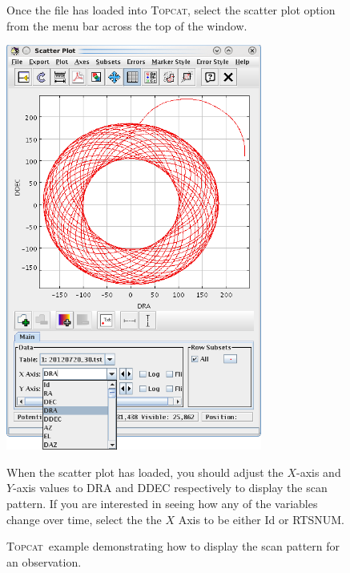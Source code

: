 \documentclass[twoside,11pt]{article}
\newcommand{\htmladdnormallink}[2]{#1}
\newenvironment{latexonly}{}{}
\renewcommand{\_}{\texttt{\symbol{95}}}
\newenvironment{fmpage}[1]{\begin{lrbox}{\fmbox}\begin{minipage}{#1}}{\end{minipage}\end{lrbox}\fbox{\usebox{\fmbox}}}
\newcommand{\topcat}{\htmladdnormallink{\textsc{Topcat}}{http://www.starlink.ac.uk/topcat}}
\begin{document}
\begin{latexonly}
\begin{figure}[ht!]
\begin{center}
\begin{fmpage}{0.95\linewidth}
\begin{minipage}[c]{0.6\linewidth}
\end{minipage}
\hspace{0.3cm}
\begin{minipage}[c]{0.32\linewidth}
Once the file has loaded into \topcat, select the scatter plot option
from the menu bar across the top of the window.
\end{minipage}

\vspace{0.5cm}

\begin{minipage}[c]{0.6\linewidth}
\centering
\includegraphics[width=0.75\textwidth]{sc21_topcat2}
\vspace{0.2cm}
\end{minipage}
\hspace{0.3cm}
\begin{minipage}[c]{0.32\linewidth}
When the scatter plot has loaded, you should adjust the $X$-axis and
$Y$-axis values to DRA and DDEC respectively to display the scan pattern.
If you are interested in seeing how any of the variables change over time,
select the the $X$ Axis to be either Id or RTS\_NUM.
\end{minipage}

\end{fmpage}
\end{center}
\caption{\small \topcat\ example demonstrating how to display the scan pattern
for an observation.}
\label{fig:topcat}
\end{figure}
\end{latexonly}
\end{document}
